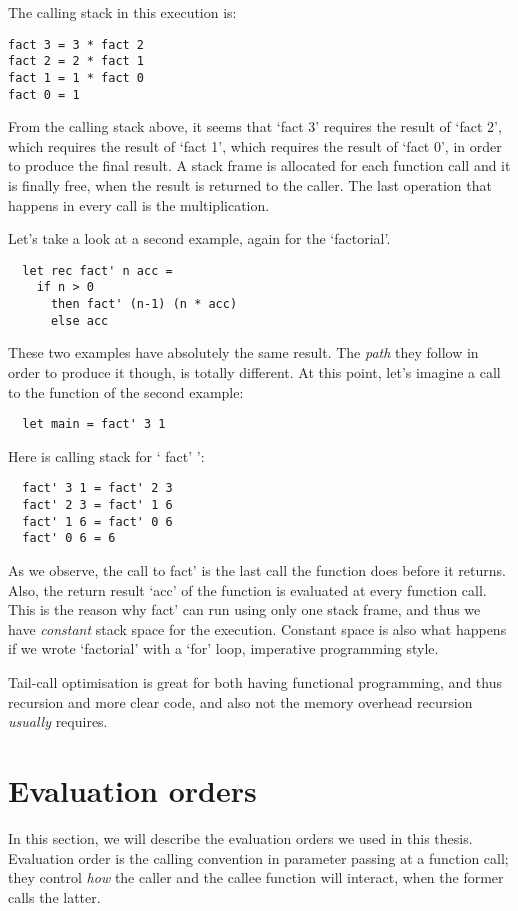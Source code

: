 \documentclass[diploma]{softlab-thesis}
\begin{document}
The calling stack in this execution is:
\begin{verbatim}
fact 3 = 3 * fact 2
fact 2 = 2 * fact 1
fact 1 = 1 * fact 0 
fact 0 = 1
\end{verbatim}

From the calling stack above, it seems that `fact 3' requires the result of `fact 2', which requires the result of `fact 1', which 
requires the result of `fact 0', in order to produce the final result. A stack frame is allocated for each function call and it is finally 
free, when the result is returned to the caller. The last operation that happens in every call is the multiplication.

Let's take a look at a second example, again for the `factorial'.
\begin{verbatim}
  let rec fact' n acc = 
    if n > 0 
      then fact' (n-1) (n * acc)
      else acc 
\end{verbatim}

These two examples have absolutely the same result. The \textit{path} they follow in order to produce it though, is totally different.
At this point, let's imagine a call to the function of the second example:
\begin{verbatim}
  let main = fact' 3 1
\end{verbatim}

Here is calling stack for ` fact' ':
\begin{verbatim}
  fact' 3 1 = fact' 2 3
  fact' 2 3 = fact' 1 6
  fact' 1 6 = fact' 0 6
  fact' 0 6 = 6
\end{verbatim}

As we observe, the call to fact' is the last call the function does before it returns. Also, the return result `acc' of the function is 
evaluated at every function call. This is the reason why fact' can run using only one stack frame, and thus we have \textit{constant} stack 
space for the execution. Constant space is also what happens if we wrote `factorial' with a `for' loop, imperative 
programming style. 

Tail-call optimisation is great for both having functional programming, and thus recursion and more clear code, and also not the 
memory overhead recursion \textit{usually} requires.

\section{Evaluation orders}
In this section, we will describe the evaluation orders we used in this thesis. Evaluation order is the calling convention
in parameter passing at a function call; they control \textit{how} the caller and the callee function will interact, 
when the former calls the latter. 
\end{document}
